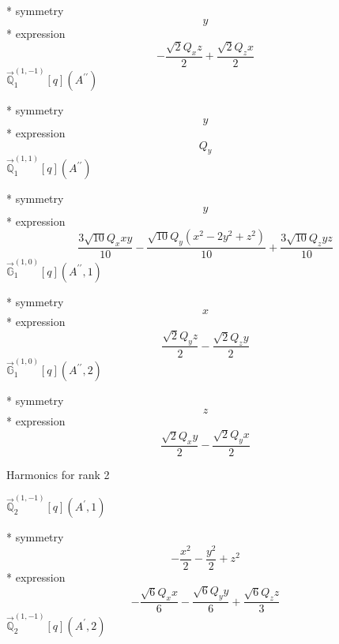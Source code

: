 \documentclass[fleqn,8pt]{jsarticle}
\begin{document}
\noindent\quad ** symmetry
\begin{dmath*}
y
\end{dmath*}
\noindent\quad ** expression
\begin{dmath*}
- \frac{\sqrt{2} Q_{x} z}{2} + \frac{\sqrt{2} Q_{z} x}{2}
\end{dmath*}
\noindent\quad $\vec{\mathbb{Q}}_{1}^{(1,-1)}[q](A^{\prime\prime})$

\noindent\quad ** symmetry
\begin{dmath*}
y
\end{dmath*}
\noindent\quad ** expression
\begin{dmath*}
Q_{y}
\end{dmath*}
\noindent\quad $\vec{\mathbb{Q}}_{1}^{(1,1)}[q](A^{\prime\prime})$

\noindent\quad ** symmetry
\begin{dmath*}
y
\end{dmath*}
\noindent\quad ** expression
\begin{dmath*}
\frac{3 \sqrt{10} Q_{x} x y}{10} - \frac{\sqrt{10} Q_{y} \left(x^{2} - 2 y^{2} + z^{2}\right)}{10} + \frac{3 \sqrt{10} Q_{z} y z}{10}
\end{dmath*}
\noindent\quad $\vec{\mathbb{G}}_{1}^{(1,0)}[q](A^{\prime\prime},1)$

\noindent\quad ** symmetry
\begin{dmath*}
x
\end{dmath*}
\noindent\quad ** expression
\begin{dmath*}
\frac{\sqrt{2} Q_{y} z}{2} - \frac{\sqrt{2} Q_{z} y}{2}
\end{dmath*}
\noindent\quad $\vec{\mathbb{G}}_{1}^{(1,0)}[q](A^{\prime\prime},2)$

\noindent\quad ** symmetry
\begin{dmath*}
z
\end{dmath*}
\noindent\quad ** expression
\begin{dmath*}
\frac{\sqrt{2} Q_{x} y}{2} - \frac{\sqrt{2} Q_{y} x}{2}
\end{dmath*}

\noindent * Harmonics for rank 2

\noindent\quad $\vec{\mathbb{Q}}_{2}^{(1,-1)}[q](A^{\prime},1)$

\noindent\quad ** symmetry
\begin{dmath*}
- \frac{x^{2}}{2} - \frac{y^{2}}{2} + z^{2}
\end{dmath*}
\noindent\quad ** expression
\begin{dmath*}
- \frac{\sqrt{6} Q_{x} x}{6} - \frac{\sqrt{6} Q_{y} y}{6} + \frac{\sqrt{6} Q_{z} z}{3}
\end{dmath*}
\noindent\quad $\vec{\mathbb{Q}}_{2}^{(1,-1)}[q](A^{\prime},2)$
\end{document}
